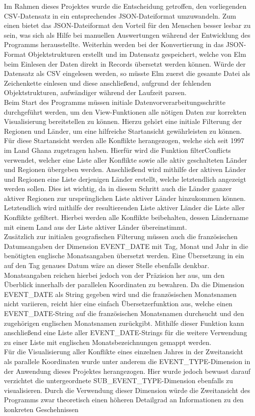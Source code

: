 \documentclass[usegeometry=true]{scrartcl}
\begin{document}
Im Rahmen dieses Projektes wurde die Entscheidung getroffen, den vorliegenden CSV-Datensatz in ein entsprechendes JSON-Dateiformat umzuwandeln. Zum einen bietet das JSON-Dateiformat den Vorteil für den Menschen besser lesbar zu sein, was sich als Hilfe bei manuellen Auswertungen während der Entwicklung des Programms herausstellte. Weiterhin werden bei der Konvertierung in das JSON-Format Objektstrukturen erstellt und im Datensatz gespeichert, welche von Elm beim Einlesen der Daten direkt in Records übersetzt werden können. Würde der Datensatz als CSV eingelesen werden, so müsste Elm zuerst die gesamte Datei als Zeichenkette einlesen und diese anschließend, aufgrund der fehlenden Objektstrukturen, aufwändiger während der Laufzeit parsen.\\ Beim Start des Programms müssen initiale Datenvorverarbeitungsschritte durchgeführt werden, um den View-Funktionen alle nötigen Daten zur korrekten Visualisierung bereitstellen zu können. Hierzu gehört eine initiale Filterung der Regionen und Länder, um eine hilfreiche Startansicht gewährleisten zu können. Für diese Startansicht werden alle Konflikte herangezogen, welche sich seit 1997 im Land Ghana zugetragen haben. Hierfür wird die Funktion filterConflicts verwendet, welcher eine Liste aller Konflikte sowie alle aktiv geschalteten Länder und Regionen übergeben werden. Anschließend wird mithilfe der aktiven Länder und Regionen eine Liste derjenigen Länder erstellt, welche letztendlich angezeigt werden sollen. Dies ist wichtig, da in diesem Schritt auch die Länder ganzer aktiver Regionen zur ursprünglichen Liste aktiver Länder hinzukommen können. Letztendlich wird mithilfe der resultierenden Liste aktiver Länder die Liste aller Konflikte gefiltert. Hierbei werden alle Konflikte beibehalten, dessen Ländername mit einem Land aus der Liste aktiver Länder übereinstimmt.\\ Zusätzlich zur initialen geografischen Filterung müssen auch die französischen Datumsangaben der Dimension EVENT\_DATE mit Tag, Monat und Jahr in die benötigten englische Monatsangaben übersetzt werden. Eine Übersetzung in ein auf den Tag genaues Datum wäre an dieser Stelle ebenfalls denkbar. Monatsangaben reichen hierbei jedoch von der Präzision her aus, um den Überblick innerhalb der parallelen Koordinaten zu bewahren. Da die Dimension EVENT\_DATE als String gegeben wird und die französischen Monatsnamen nicht variieren, reicht hier eine einfach Übersetzerfunktion aus, welche einen EVENT\_DATE-String auf die französischen Monatsnamen durchsucht und den zugehörigen englischen Monatsnamen zurückgibt. Mithilfe dieser Funktion kann anschließend eine Liste aller EVENT\_DATE-Strings für die weitere Verwendung zu einer Liste mit englischen Monatsbezeichnungen gemappt werden.\\ Für die Visualisierung aller Konflikte eines einzelnen Jahres in der Zweitansicht als parallele Koordinaten wurde unter anderem die EVENT\_TYPE-Dimension in der Anwendung dieses Projektes herangezogen. Hier wurde jedoch bewusst darauf verzichtet die untergeordnete SUB\_EVENT\_TYPE-Dimension ebenfalls zu visualisieren. Durch die Verwendung dieser Dimension würde die Zweitansicht des Programms zwar theoretisch einen höheren Detailgrad an Informationen zu den konkreten Geschehnissen 
\end{document}
